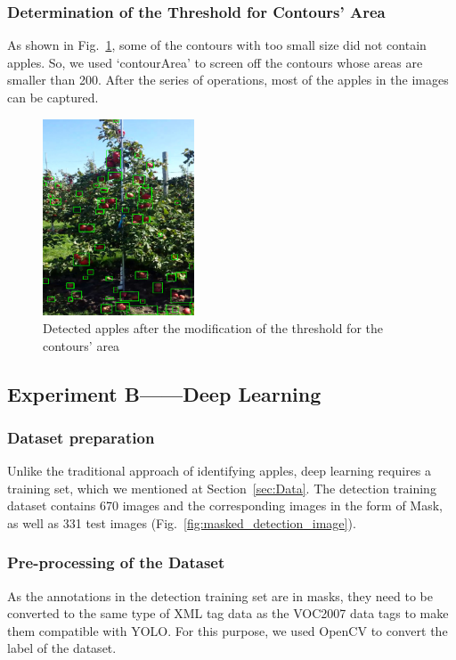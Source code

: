 \subsubsection{Determination of the Threshold for Contours' Area}
As shown in Fig.~\ref{fig:contour_modified}, some of the contours with too small size did not contain apples. So, we used ‘contourArea’ to screen off the contours whose areas are smaller than 200. After the series of operations, most of the apples in the images can be captured.

\begin{figure}[!ht]
    \centering
    \includegraphics[width=0.4\textwidth]{images/detection_contours_outcome.png}
    \caption{Detected apples after the modification of the threshold for the contours' area}
    \label{fig:contour_modified}
\end{figure}

\subsection{Experiment B——Deep Learning}

\subsubsection{Dataset preparation}
Unlike the traditional approach of identifying apples, deep learning requires a training set, which we mentioned at Section~\ref{sec:Data}. The detection training dataset contains 670 images and the corresponding images in the form of Mask, as well as 331 test images (Fig.~\ref{fig:masked_detection_image}). 

\subsubsection{Pre-processing of the Dataset}
As the annotations in the detection training set are in masks, they need to be converted to the same type of XML tag data as the VOC2007 data tags to make them compatible with YOLO. For this purpose, we used OpenCV to convert the label of the dataset.

